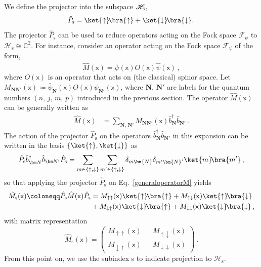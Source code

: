 \documentclass[letterpaper,12pt,titlepage,oneside,final]{book}
\newcommand{\mf}{\mathsf}%
\newcommand{\tc}[1]{\textsc{#1}}
\begin{document}
We define the projector into the subspace $\mathscr{H}_\tc{s}$,
\begin{equation}
    \hat{P}_{\text{s}} = \ket{\uparrow}\!\bra{\uparrow}+\ket{\downarrow}\!\bra{\downarrow}. \, 
\end{equation}
The projector $\hat{P}_\text{s}$ can be used to reduce operators acting on the Fock space $\mathcal{F}_\psi$ to $\mathscr{H}_\text{s}\cong \mathbb{C}^2$. For instance, consider an operator acting on the Fock space $\mathcal{F}_\psi$ of the form, 
\begin{equation}\label{generaloperatorM}
    \hat{M}(\mf x) = \hat{\bar{\psi}}(\mf{x})O(\mf{x})\hat{\psi}(\mf{x})\,,
\end{equation}
where $O(\mf{x})$ is an operator that acts on (the classical) spinor space. Let ${M_{\bm{N}\bm{N}'}}(\mf{x}) \coloneqq \bar{\psi}_{\bm{N}}(\mf{x}) O(\mf{x})\psi_{\bm{N}'}(\mf{x})$, where $\bm{N}, \, \bm{N}'$ are labels for the  quantum numbers $(n,\,j,\, m,\,p)$ introduced in the previous section. The operator $\hat{M}(\mf x)$ can be generally written as
\begin{align}\label{Moperator}
    \hat{M}(\mf x) &= \sum_{\bm{N},\,\bm{N}'} M_{\bm{N}\bm{N}'}(\mf{x})\hat{b}^\dagger_{\bm{N}}\hat{b}_{\bm{N}'}\,.
\end{align}
The action of the projector $\hat{P}_\text{s}$ on the operators $\hat{b}^\dagger_{\bm{N}}\hat{b}_{\bm{N}'}$ in this expansion can be written in the basis $\{\ket{\uparrow},\ket{\downarrow}\}$ as 
\begin{equation}
    \hat{P}_\text{s}\hat{b}_{\bm N}^\dagger \hat{b}_{\bm N'} \hat{P}_\text{s} = \sum_{m \in \{\uparrow, \downarrow\}} \sum_{ m' \in \{\uparrow, \downarrow\}} \delta_{m \bm{N}} \delta_{m' \bm{N}'}\ket{m}\!\bra{m'}\, ,
\end{equation}
so that applying the projector $\hat{P}_\text{s}$ on Eq.~\eqref{generaloperatorM} yields
\begin{align}
    \hat{M}_{\text{s}}(\mf x) \coloneqq \hat{P}_\text{s}\hat{M}(\mf x)\hat{P}_\text{s} &= M_{\uparrow\uparrow}(\mf{x})\ket{\uparrow}\!\bra{\uparrow} + M_{\uparrow\downarrow}(\mf{x})\ket{\uparrow}\!\bra{\downarrow} \nonumber\\*
    &+ M_{\downarrow\uparrow}(\mf{x})\ket{\downarrow}\!\bra{\uparrow} + M_{\downarrow\downarrow}(\mf{x})\ket{\downarrow}\!\bra{\downarrow}\,,
\end{align}
with matrix representation
\begin{equation}
    \hat{M}_\text{s}(\mf x) = \begin{pmatrix}
        M_{\uparrow\uparrow}(\mf{x})&&M_{\uparrow\downarrow}(\mf{x})\\
        M_{\downarrow\uparrow}(\mf{x})&&M_{\downarrow\downarrow}(\mf{x})
    \end{pmatrix}\, .
\end{equation}
From this point on, we use the subindex s to indicate projection to $\mathscr{H}_\text{s}$.
\end{document}
